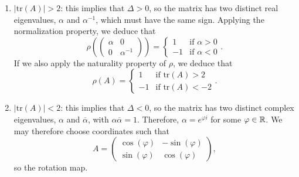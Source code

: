 \begin{enumerate}
	\item $|\text{tr}(A)| > 2$: this implies that $\Delta > 0$, so the matrix has two distinct real eigenvalues, $\alpha$ and $\alpha^{-1}$, which must have the same sign. Applying the normalization property, we deduce that
	\[\rho\left(\begin{pmatrix}\alpha & 0 \\ 0 & \alpha^{-1}\end{pmatrix}\right) = \left\{ \begin{array}{lc} 1 & \text{if } \alpha > 0 \\ -1 & \text{if } \alpha < 0 \end{array} \right. .\]
	If we also apply the naturality property of $\rho$, we deduce that
	\[\rho(A) = \left\{ \begin{array}{lc} 1 & \text{if tr}(A) > 2 \\ -1 & \text{if tr}(A) < -2 \end{array} \right. .\]
	\item $|\text{tr}(A)| < 2$: this implies that $\Delta < 0$, so the matrix has two distinct complex eigenvalues, $\alpha$ and $\overline{\alpha}$, with $\alpha\overline{\alpha} = 1$. Therefore, $\alpha = e^{\varphi i}$ for some $\varphi \in \mathbb{R}$. We may therefore choose coordinates such that
	\[A = \begin{pmatrix} \cos(\varphi) & -\sin(\varphi) \\ \sin(\varphi) & \cos(\varphi) \end{pmatrix} ,\]
	so the rotation map.
\end{enumerate}
